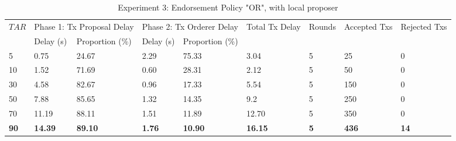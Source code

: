 \documentclass[10pt,journal,compsoc, twoside]{IEEEtran}
\begin{document}
\begin{table*}[htbp]
	\caption{Experiment 3: Endorsement Policy "OR", with local proposer}
	\begin{tabular}{|l|l|l|l|l|l|l|l|l|}
		\hline
		\multirow{2}{*}{$TAR$} & \multicolumn{2}{l|}{Phase 1: Tx Proposal Delay} & \multicolumn{2}{l|}{Phase 2: Tx Orderer Delay} & \multirow{2}{*}{Total Tx Delay} & \multirow{2}{*}{Rounds} & \multirow{2}{*}{Accepted Txs} & \multirow{2}{*}{Rejected Txs} \\ \cline{2-5}
		& Delay (s)              & Proportion (\%)        & Delay (s)             & Proportion (\%)        &                                 &                         &                               &                               \\ \hline
		5                      & 0.75                   & 24.67                  & 2.29                  & 75.33                  & 3.04                            & 5                       & 25                            & 0                             \\ \hline
		10                     & 1.52                   & 71.69                  & 0.60                  & 28.31                  & 2.12                            & 5                       & 50                            & 0                             \\ \hline
		30                     & 4.58                   & 82.67                  & 0.96                  & 17.33                  & 5.54                            & 5                       & 150                           & 0                             \\ \hline
		50                     & 7.88                   & 85.65                  & 1.32                  & 14.35                  & 9.2                             & 5                       & 250                           & 0                             \\ \hline
		70                     & 11.19                  & 88.11                  & 1.51                  & 11.89                  & 12.70                           & 5                       & 350                           & 0                             \\ \hline
		\textbf{90}            & \textbf{14.39}         & \textbf{89.10}         & \textbf{1.76}         & \textbf{10.90}         & \textbf{16.15}                  & \textbf{5}              & \textbf{436}                  & \textbf{14}                   \\ \hline
	\end{tabular}
\end{table*}
\end{document}
